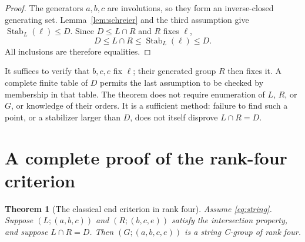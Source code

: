 \documentclass[11pt]{article}
\newtheorem{theorem}{Theorem}
\theoremstyle{remark}
\newcommand{\Stab}{\operatorname{Stab}}
\begin{document}
\begin{proof}
The generators $a,b,c$ are involutions, so they form an inverse-closed
generating set. Lemma~\ref{lem:schreier} and the third assumption give
$\Stab_L(\ell)\leq D$. Since $D\leq L\cap R$ and $R$ fixes $\ell$,
\[
 D\leq L\cap R\leq\Stab_L(\ell)\leq D.
\]
All inclusions are therefore equalities.
\end{proof}

It suffices to verify that $b,c,e$ fix $\ell$; their generated group $R$
then fixes it. A complete finite table of $D$ permits the last assumption
to be checked by membership in that table. The theorem does not require
enumeration of $L$, $R$, or $G$, or knowledge of their orders. It is a
sufficient method: failure to find such a point, or a stabilizer larger than
$D$, does not itself disprove $L\cap R=D$.

\section{A complete proof of the rank-four criterion}

\begin{theorem}[The classical end criterion in rank four]\label{thm:rank4}
Assume \eqref{eq:string}. Suppose $(L;(a,b,c))$ and $(R;(b,c,e))$
satisfy the intersection property, and suppose $L\cap R=D$.
Then $(G;(a,b,c,e))$ is a string C-group of rank four.
\end{theorem}
\end{document}
